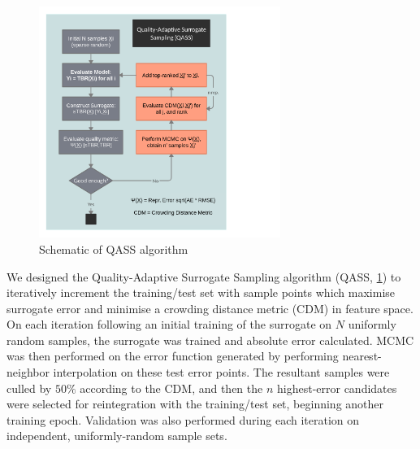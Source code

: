 \begin{figure}
  \vspace{-35pt}
  \begin{center}
    \includegraphics[width=0.7\textwidth]{fig4_qassplan.png}
    \caption{Schematic of QASS algorithm}
    \label{fig:qassplan}
  \end{center}
  \vspace{-80pt}
\end{figure}

We designed the Quality-Adaptive Surrogate Sampling algorithm (QASS,
\cref{fig:qassplan}) to iteratively increment the training/test set with sample
points which maximise surrogate error and minimise a crowding distance metric
(CDM) \cite{Solonen2012} in feature space. On each iteration following an initial training of the surrogate on $N$ uniformly random samples, the surrogate was trained and absolute error calculated. MCMC was then performed on the error function generated by performing nearest-neighbor interpolation on these test error points. The resultant samples were culled by $50\%$ according to the CDM, and then the $n$ highest-error candidates were selected for reintegration with the training/test set, beginning another training epoch. Validation was also performed during each iteration on independent, uniformly-random sample sets.




